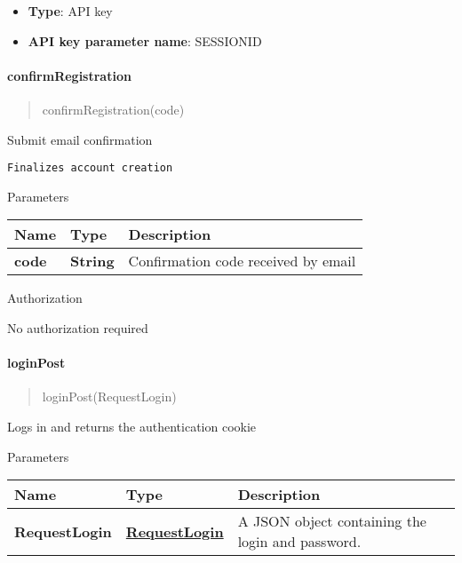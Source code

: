 \begin{itemize}
\tightlist
\item
  \textbf{Type}: API key
\item
  \textbf{API key parameter name}: SESSIONID
\end{itemize}

\hypertarget{confirmregistration}{%
\paragraph{\texorpdfstring{\textbf{confirmRegistration}}{confirmRegistration}}\label{confirmregistration}}

\begin{quote}
confirmRegistration(code)
\end{quote}

Submit email confirmation

\begin{verbatim}
Finalizes account creation
\end{verbatim}

Parameters

\begin{longtable}[]{@{}lll@{}}
\toprule
Name & Type & Description\tabularnewline
\midrule
\endhead
\textbf{code} & \textbf{String} & Confirmation code received by
email\tabularnewline
\bottomrule
\end{longtable}

Authorization

No authorization required

\hypertarget{loginpost}{%
\paragraph{\texorpdfstring{\textbf{loginPost}}{loginPost}}\label{loginpost}}

\begin{quote}
loginPost(RequestLogin)
\end{quote}

Logs in and returns the authentication cookie

Parameters

\begin{longtable}[]{@{}lll@{}}
\toprule
Name & Type & Description\tabularnewline
\midrule
\endhead
\textbf{RequestLogin} &
\href{../Models/RequestLogin.md}{\textbf{RequestLogin}} & A JSON object
containing the login and password.\tabularnewline
\bottomrule
\end{longtable}

